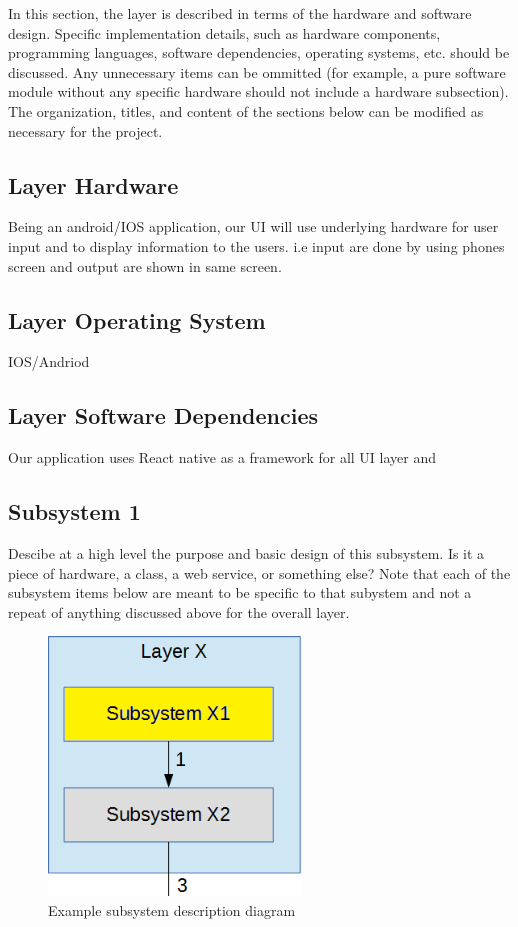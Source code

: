 In this section, the layer is described in terms of the hardware and software design. Specific implementation details, such as hardware components, programming languages, software dependencies, operating systems, etc. should be discussed. Any unnecessary items can be ommitted (for example, a pure software module without any specific hardware should not include a hardware subsection). The organization, titles, and content of the sections below can be modified as necessary for the project.

\subsection{Layer Hardware}
Being an android/IOS application, our UI will use underlying hardware for user input and to display information to the users. i.e input are done by using phones screen and output are shown in same screen. 

\subsection{Layer Operating System}
IOS/Andriod

\subsection{Layer Software Dependencies}
Our application uses React native as a framework for all UI layer and 

\subsection{Subsystem 1}
Descibe at a high level the purpose and basic design of this subsystem. Is it a piece of hardware, a class, a web service, or something else? Note that each of the subsystem items below are meant to be specific to that subystem and not a repeat of anything discussed above for the overall layer.

\begin{figure}[h!]
	\centering
 	\includegraphics[width=0.60\textwidth]{images/subsystem}
 \caption{Example subsystem description diagram}
\end{figure}

